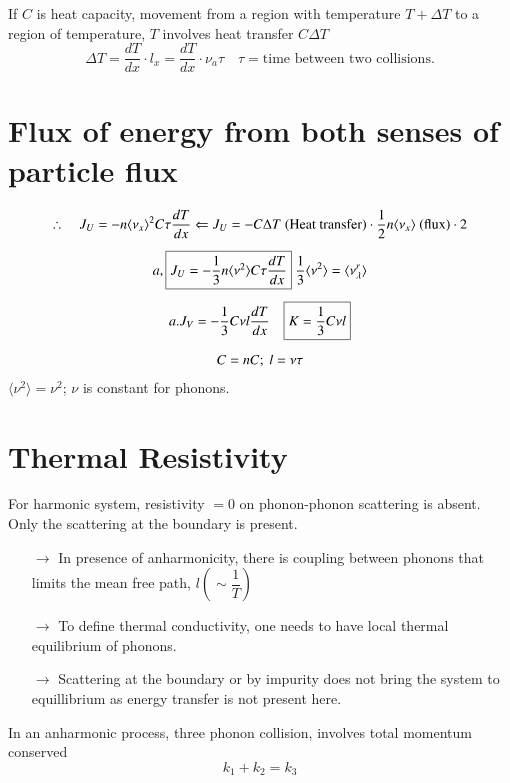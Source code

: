 If $C$ is heat capacity, movement from a region with temperature $T+\Delta T$ to a region of temperature, $T$ involves heat transfer $C\Delta T$
$$
\Delta T = \dfrac{dT}{dx}\cdot l_{x}=\dfrac{dT}{dx}\cdot \nu_{a}\tau\quad \tau=\text{time between two collisions.}
$$

\section*{Flux of energy from both senses of particle flux}
\begin{gather*}
\therefore\quad J_{U}=-n\langle \nu_{x}\rangle^{2}C\tau \dfrac{dT}{dx}\Leftarrow J_{U}=-C\Delta T\text{ (Heat transfer)}\cdot \frac{1}{2}n\langle \nu_{x}\rangle \text{ (flux)} \cdot 2\\[5pt]
a, \fbox{$J_{U}=-\dfrac{1}{3}n\langle \nu^{2}\rangle C\tau \dfrac{dT}{dx}$} \ \dfrac{1}{3}\langle \nu^{2}\rangle =\langle \nu^{r}_{\lambda}\rangle\\[5pt]
a. J_{V}= -\dfrac{1}{3}C\nu l \dfrac{dT}{dx}\quad \fbox{$K=\dfrac{1}{3}C\nu l$}\\[5pt]
C=nC; \ l=\nu\tau
\end{gather*}
$\langle \nu^{2}\rangle=\nu^{2}$; $\nu$ is constant for phonons.

\section*{Thermal Resistivity}

For harmonic system, resistivity $=0$ on phonon-phonon scattering is absent. Only the scattering at the boundary is present.
\begin{itemize}
\itemsep=0pt
\item[$\to$] In presence of anharmonicity, there is coupling between phonons that limits the mean free path, $l\left(\sim \dfrac{1}{T}\right)$

\item[$\to$] To define thermal conductivity, one needs to have local thermal equilibrium of phonons.

\item[$\to$] Scattering at the boundary or by impurity does not bring the system to equillibrium as energy transfer is not present here.
\end{itemize}
In an anharmonic process, three phonon collision, involves total momentum conserved
\begin{equation*}
k_{1}+k_{2}=k_{3}\tag{A}\label{lec20-eqA}
\end{equation*}

